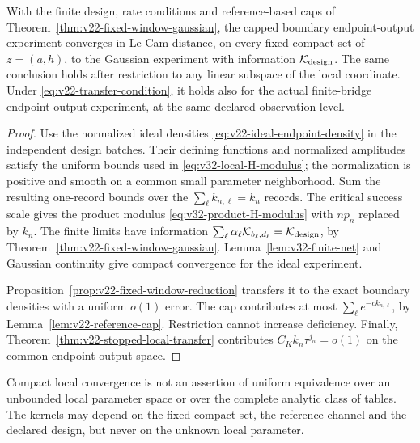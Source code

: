 \begin{corollary}
\label{cor:v32-compact-fixed-window}
With the finite design, rate conditions and reference-based caps of
Theorem~\ref{thm:v22-fixed-window-gaussian}, the capped boundary
endpoint-output experiment converges in Le Cam distance, on every fixed
compact set of \(z=(a,h)\), to the Gaussian experiment with information
\(\mathcal K_{\rm design}\).  The same conclusion holds after restriction
to any linear subspace of the local coordinate.  Under
\eqref{eq:v22-transfer-condition}, it holds also for the actual finite-bridge
endpoint-output experiment, at the same declared observation level.
\end{corollary}

\begin{proof}
Use the normalized ideal densities
\eqref{eq:v22-ideal-endpoint-density} in the independent design batches.
Their defining functions and normalized amplitudes satisfy the uniform
bounds used in \eqref{eq:v32-local-H-modulus}; the normalization is positive
and smooth on a common small parameter neighborhood.  Sum the resulting
one-record bounds over the \(\sum_\ell k_{n,\ell}=k_n\) records.
The critical success scale gives the product modulus
\eqref{eq:v32-product-H-modulus} with \(n p_n\) replaced by \(k_n\).
The finite limits have information
\(\sum_\ell\alpha_\ell\mathcal K_{b_\ell,d_\ell}
=\mathcal K_{\rm design}\), by
Theorem~\ref{thm:v22-fixed-window-gaussian}.  Lemma~\ref{lem:v32-finite-net}
and Gaussian continuity give compact convergence for the ideal experiment.

Proposition~\ref{prop:v22-fixed-window-reduction} transfers it to the exact
boundary densities with a uniform \(o(1)\) error.  The cap contributes at
most \(\sum_\ell e^{-c k_{n,\ell}}\), by
Lemma~\ref{lem:v22-reference-cap}.  Restriction cannot increase deficiency.
Finally, Theorem~\ref{thm:v22-stopped-local-transfer} contributes
\(C_Kk_n\tau^{j_n}=o(1)\) on the common endpoint-output space.
\end{proof}

\begin{remark}
Compact local convergence is not an assertion of uniform equivalence over
an unbounded local parameter space or over the complete analytic class of
tables.  The kernels may depend on the fixed compact set, the reference
channel and the declared design, but never on the unknown local parameter.
\end{remark}

